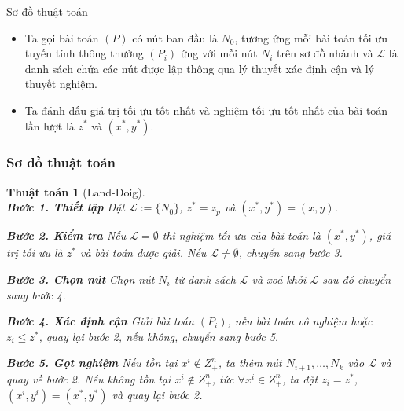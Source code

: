 \documentclass[12pt,a4paper]{report}
\newtheorem{ttoan}{Thuật toán}
\begin{document}
{Sơ đồ thuật toán}
\begin{itemize}
\item Ta gọi bài toán $(P)$ có nút ban đầu là $N_0$, tương ứng mỗi bài toán tối ưu tuyến tính thông thường $(P_i)$ ứng với mỗi nút $N_i$ trên sơ đồ nhánh và $\mathcal{L}$ là danh sách chứa các nút được lập thông qua lý thuyết xác định cận và lý thuyết nghiệm.
\item Ta đánh dấu giá trị tối ưu tốt nhất và nghiệm tối ưu tốt nhất của bài toán lần lượt là $z^*$ và $(x^*,y^*)$.
\end{itemize}

\subsubsection*{Sơ đồ thuật toán}
\begin{ttoan}[Land-Doig]
\setlength{\parindent}{4em}
\noindent \\
\noindent \textbf{Bước 1. Thiết lập}
Đặt $\mathcal{L}:=\{N_0 \}$, $z^*=z_p$ và $(x^*,y^*)=(x,y)$. 

\noindent \textbf{Bước 2. Kiểm tra} 
Nếu $\mathcal{L} = \emptyset$ thì nghiệm tối ưu của bài toán là $(x^*,y^*)$, giá trị  tối ưu là $z^*$ và bài toán được giải. 
Nếu $\mathcal{L} \neq \emptyset$, chuyển sang bước 3.

\noindent \textbf{Bước 3. Chọn nút} 
Chọn nút $N_i$ từ danh sách $\mathcal{L}$ và xoá khỏi $\mathcal{L}$ sau đó chuyển sang  bước 4. 

\noindent \textbf{Bước 4. Xác định cận}  
Giải bài toán $(P_i)$, nếu bài toán vô nghiệm hoặc $z_i \leq z^*$, quay  lại bước 2, nếu không, chuyển sang bước 5.

\noindent \textbf{Bước 5. Gọt nghiệm} 
Nếu tồn tại $x^i \notin Z^n_+$, ta thêm nút $N_{i+1}, \ldots , N_{k}$ vào $\mathcal{L}$ và quay  về bước 2. 
Nếu không tồn tại $x^i \notin Z^n_+$, tức $\forall x^i \in Z^n_+$, ta đặt $z_i = z^*$,  $(x^i,y^i) = (x^*,y^*)$ và quay lại bước 2.
\end{ttoan}
\end{document}

